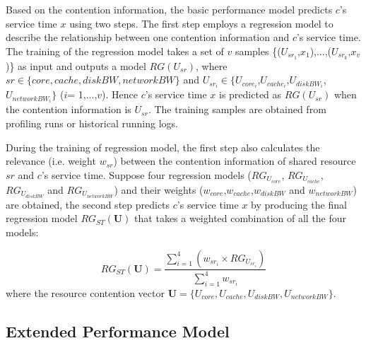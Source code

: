 \documentclass[10pt, conference, compsocconf]{IEEEtran}
\begin{document}
Based on the contention information, the basic performance model predicts $c$'s service time $x$ using two steps. The first step employs a regression model to describe the relationship between one contention information and $c$'s service time.
The training of the regression model takes a set of $v$ samples \{({$U_{sr_1}$,$x_{1}$}),...,({$U_{sr_k}$,$x_{v}$})\} as input and outputs a model $RG(U_{sr})$, where $sr \in \{core, cache, diskBW, networkBW\}$ and $U_{sr_i} \in \{U_{core_i}$,$U_{cache_i}$,$U_{diskBW_i}$,$U_{networkBW_i}\}$ ($i$= 1,...,$v$). Hence $c$'s service time $x$ is predicted as $RG(U_{sr})$ when the contention information is $U_{sr}$. The training samples are obtained from profiling runs or historical running logs.













During the training of regression model, the first step also calculates the relevance (i.e. weight $w_{sr}$) between the contention information of shared resource $sr$ and $c$'s service time.
Suppose four regression models ($RG_{U_{core}}$, $RG_{U_{cache}}$, $RG_{U_{diskBW}}$ and $RG_{U_{networkBW}}$) and their weights ($w_{core}$,$w_{cache}$,$w_{diskBW}$ and $w_{networkBW}$) are obtained, the second step predicts $c$'s service time $x$ by producing the final regression model $RG_{ST}(\textbf{U})$ that takes a weighted combination of all the four models:

\begin{equation}
RG_{ST}(\textbf{U})=\frac{\sum_{i=1}^4(w_{sr_i} \times RG_{U_{sr_i}})}{\sum_{i=1}^4 w_{sr_i}}
\label{Equation: regressionModel}
\end{equation}
where the resource contention vector $\textbf{U}=\{U_{core},U_{cache},U_{diskBW},U_{networkBW}\}$.

















\subsection{Extended Performance Model} \label{Section: Extended Performance Model}
\end{document}
